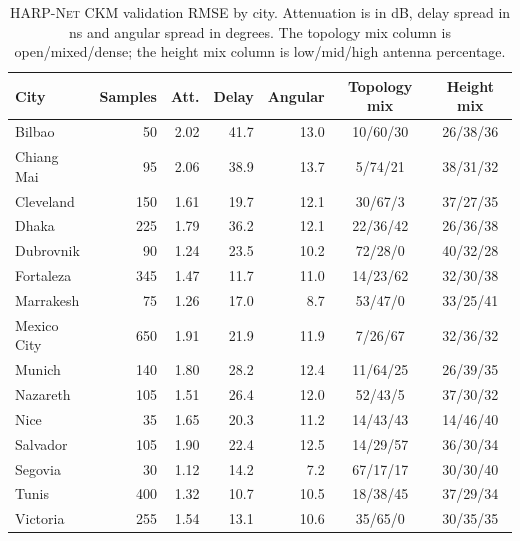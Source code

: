 \begin{table}[!htbp]
\centering
\caption[\textsc{HARP-Net CKM} validation RMSE by city.]%
{\textsc{HARP-Net CKM} validation RMSE by city. Attenuation is in dB, delay
spread in ns and angular spread in degrees. The topology mix column is
open/mixed/dense; the height mix column is low/mid/high antenna percentage.}
\label{tab:try80_val_city_audit}
\scriptsize
\begin{tabularx}{\textwidth}{>{\raggedright\arraybackslash}Xrrrrcc}
\toprule
City & Samples & Att. & Delay & Angular & Topology mix & Height mix \\
\midrule
Bilbao & 50 & 2.02 & 41.7 & 13.0 & 10/60/30 & 26/38/36 \\
Chiang Mai & 95 & 2.06 & 38.9 & 13.7 & 5/74/21 & 38/31/32 \\
Cleveland & 150 & 1.61 & 19.7 & 12.1 & 30/67/3 & 37/27/35 \\
Dhaka & 225 & 1.79 & 36.2 & 12.1 & 22/36/42 & 26/36/38 \\
Dubrovnik & 90 & 1.24 & 23.5 & 10.2 & 72/28/0 & 40/32/28 \\
Fortaleza & 345 & 1.47 & 11.7 & 11.0 & 14/23/62 & 32/30/38 \\
Marrakesh & 75 & 1.26 & 17.0 & 8.7 & 53/47/0 & 33/25/41 \\
Mexico City & 650 & 1.91 & 21.9 & 11.9 & 7/26/67 & 32/36/32 \\
Munich & 140 & 1.80 & 28.2 & 12.4 & 11/64/25 & 26/39/35 \\
Nazareth & 105 & 1.51 & 26.4 & 12.0 & 52/43/5 & 37/30/32 \\
Nice & 35 & 1.65 & 20.3 & 11.2 & 14/43/43 & 14/46/40 \\
Salvador & 105 & 1.90 & 22.4 & 12.5 & 14/29/57 & 36/30/34 \\
Segovia & 30 & 1.12 & 14.2 & 7.2 & 67/17/17 & 30/30/40 \\
Tunis & 400 & 1.32 & 10.7 & 10.5 & 18/38/45 & 37/29/34 \\
Victoria & 255 & 1.54 & 13.1 & 10.6 & 35/65/0 & 30/35/35 \\
\bottomrule
\end{tabularx}
\end{table}

